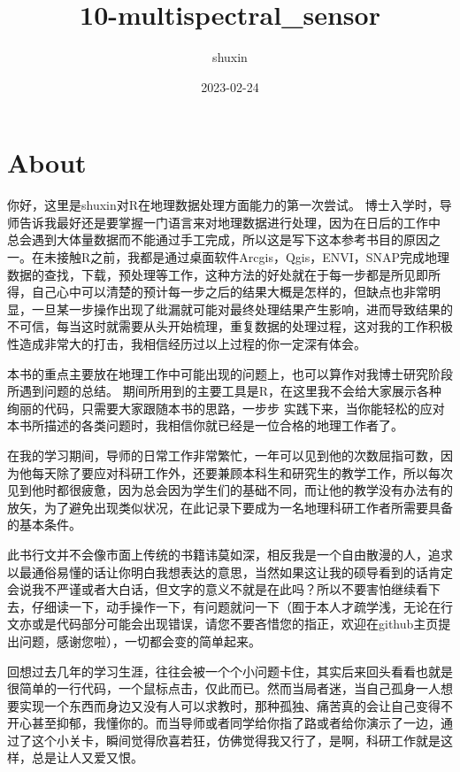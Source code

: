 \documentclass[
]{book}
\title{10-multispectral\_sensor}
\author{shuxin}
\date{2023-02-24}
\begin{document}
\maketitle

{
\setcounter{tocdepth}{1}
\tableofcontents
}
\hypertarget{about}{%
\chapter{About}\label{about}}

你好，这里是shuxin对R在地理数据处理方面能力的第一次尝试。 博士入学时，导师告诉我最好还是要掌握一门语言来对地理数据进行处理，因为在日后的工作中 总会遇到大体量数据而不能通过手工完成，所以这是写下这本参考书目的原因之一。在未接触R之前，我都是通过桌面软件Arcgis，Qgis，ENVI，SNAP完成地理数据的查找，下载，预处理等工作，这种方法的好处就在于每一步都是所见即所得，自己心中可以清楚的预计每一步之后的结果大概是怎样的，但缺点也非常明显，一旦某一步操作出现了纰漏就可能对最终处理结果产生影响，进而导致结果的不可信，每当这时就需要从头开始梳理，重复数据的处理过程，这对我的工作积极性造成非常大的打击，我相信经历过以上过程的你一定深有体会。

本书的重点主要放在地理工作中可能出现的问题上，也可以算作对我博士研究阶段所遇到问题的总结。 期间所用到的主要工具是R，在这里我不会给大家展示各种绚丽的代码，只需要大家跟随本书的思路，一步步 实践下来，当你能轻松的应对本书所描述的各类问题时，我相信你就已经是一位合格的地理工作者了。

在我的学习期间，导师的日常工作非常繁忙，一年可以见到他的次数屈指可数，因为他每天除了要应对科研工作外，还要兼顾本科生和研究生的教学工作，所以每次见到他时都很疲惫，因为总会因为学生们的基础不同，而让他的教学没有办法有的放矢，为了避免出现类似状况，在此记录下要成为一名地理科研工作者所需要具备的基本条件。

此书行文并不会像市面上传统的书籍讳莫如深，相反我是一个自由散漫的人，追求以最通俗易懂的话让你明白我想表达的意思，当然如果这让我的硕导看到的话肯定会说我不严谨或者大白话，但文字的意义不就是在此吗？所以不要害怕继续看下去，仔细读一下，动手操作一下，有问题就问一下（囿于本人才疏学浅，无论在行文亦或是代码部分可能会出现错误，请您不要吝惜您的指正，欢迎在github主页提出问题，感谢您啦），一切都会变的简单起来。

回想过去几年的学习生涯，往往会被一个个小问题卡住，其实后来回头看看也就是很简单的一行代码，一个鼠标点击，仅此而已。然而当局者迷，当自己孤身一人想要实现一个东西而身边又没有人可以求教时，那种孤独、痛苦真的会让自己变得不开心甚至抑郁，我懂你的。而当导师或者同学给你指了路或者给你演示了一边，通过了这个小关卡，瞬间觉得欣喜若狂，仿佛觉得我又行了，是啊，科研工作就是这样，总是让人又爱又恨。
\end{document}
